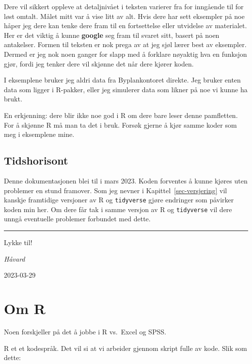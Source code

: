\documentclass[
  letterpaper,
  DIV=11,
  numbers=noendperiod]{scrreprt}
\begin{document}
Dere vil sikkert oppleve at detaljnivået i teksten varierer fra for
inngående til for løst omtalt. Målet mitt var å vise litt av alt. Hvis
dere har sett eksempler på noe håper jeg dere kan tenke dere fram til en
fortsettelse eller utvidelse av materialet. Her er det viktig å kunne
\textbf{google} seg fram til svaret sitt, basert på noen antakelser.
Formen til teksten er nok prega av at jeg sjøl lærer best av eksempler.
Dermed er jeg nok noen ganger for slapp med å forklare nøyaktig hva en
funksjon gjør, fordi jeg tenker dere vil skjønne det når dere kjører
koden.

I eksemplene bruker jeg aldri data fra Byplankontoret direkte. Jeg
bruker enten data som ligger i R-pakker, eller jeg simulerer data som
likner på noe vi kunne ha brukt.

En erkjenning: dere blir ikke noe god i R om dere bare leser denne
pamfletten. For å skjønne R må man ta det i bruk. Forsøk gjerne å kjør
samme koder som meg i eksemplene mine.

\hypertarget{tidshorisont}{%
\section{Tidshorisont}\label{tidshorisont}}

Denne dokumentasjonen blei til i mars 2023. Koden forventes å kunne
kjøres uten problemer en stund framover. Som jeg nevner i
Kapittel~\ref{sec-versjering} vil kanskje framtidige versjoner av R og
\texttt{tidyverse} gjøre endringer som påvirker koden min her. Om dere
får tak i samme versjon av R og \texttt{tidyverse} vil dere unngå
eventuelle problemer forbundet med dette.

\begin{center}\rule{0.5\linewidth}{0.5pt}\end{center}

Lykke til!

\emph{Håvard}

2023-03-29


\hypertarget{om-r}{%
\chapter{Om R}\label{om-r}}

Noen forskjeller på det å jobbe i R vs.~Excel og SPSS.

R et et kodespråk. Det vil si at vi arbeider gjennom skript fulle av
kode. Slik som dette:
\end{document}

